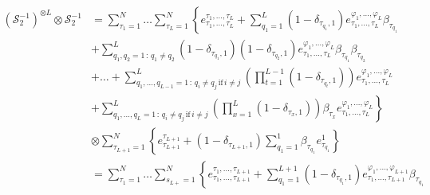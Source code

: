 \documentclass[10pt]{article}
\numberwithin{equation}{section}
\numberwithin{equation}{subsection}
\begin{document}
\begin{align*}
    	\left(\mathcal{S}_{2}^{-1}\right)^{\otimes L}\otimes \mathcal{S}_{2}^{-1}&=%
    	\sum_{\tau_{1}=1}^{N}\ldots\sum_{\tau_{L}=1}^{N}\left\{e_{\tau_{1},\ldots,\tau_{L}}^{\tau_{1},\ldots,\tau_{L}}+\sum_{q_{1}=1}^{L}(1-\delta_{\tau_{q_{1}},1})e_{\tau_{1},\ldots,\tau_{L}}^{\varphi_{1},\ldots,\varphi_{L}}\beta_{\tau_{q_{1}}}\right. 
    	\\&+\left. \sum_{q_{1},q_{2}=1\,:\,q_{1}\neq q_{2}}^{L}(1-\delta_{\tau_{q_{1}},1})(1-\delta_{\tau_{q_{2}},1})e^{\varphi_{1},\ldots,\varphi_{L}}_{\tau_{1},\ldots,\tau_{L}}\beta_{\tau_{q_{1}}}\beta_{\tau_{q_{2}}}\right.
    	\\&+\left.
    	\ldots+	\sum_{q_{1},\ldots,q_{L-1}=1\,:\,q_{i}\neq q_{j}\,\text{if}\,i\neq j}^{L}\left(\prod_{t=1}^{L-1}(1-\delta_{\tau_{q_{t}},1})\right)e_{\tau_{1},\ldots,\tau_{L}}^{\varphi_{1},\ldots,\varphi_{L}}
    	\right. \\&+ \left. 
    	\sum_{q_{1},\ldots,q_{L}=1\,:\,q_{i}\neq q_{j}\,\text{if}\,i\neq j}^{L}\left(\prod_{x=1}^{L}(1-\delta_{\tau_{x},1})\right)\beta_{\tau_{x}}e_{\tau_{1},\ldots,\tau_{L}}^{\varphi_{1},\ldots,\varphi_{L}} \right\}
    	\\&
    	\otimes \sum_{\tau_{L+1}=1}^{N}\left\{e_{\tau_{L+1}}^{\tau_{L+1}}+(1-\delta_{\tau_{L+1},1})\sum_{q_{1}=1}^{1}\beta_{\tau_{q_{1}}}e_{\tau_{q_{1}}}^{1}\right\}
    	\\&=
    	\sum_{\tau_{1}=1}^{N}\ldots\sum_{s_{L+}=1}^{N}\left\{e_{\tau_{1},\ldots,\tau_{L+1}}^{\tau_{1},\ldots,\tau_{L+1}}+\sum_{q_{1}=1}^{L+1}(1-\delta_{\tau_{q_{1}},1})e_{\tau_{1},\ldots,\tau_{L+1}}^{\varphi_{1},\ldots,\varphi_{L+1}}\beta_{\tau_{q_{1}}}\right. 

\end{align*}
\end{document}
